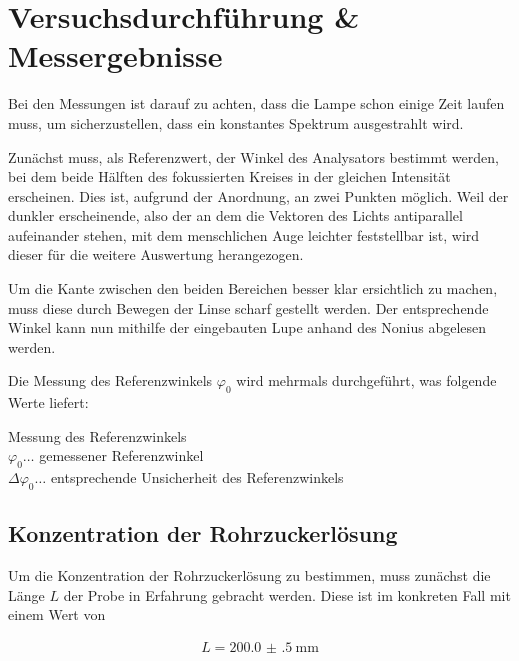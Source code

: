 \documentclass[11pt,ngerman]{scrartcl}
\begin{document}
\section{Versuchsdurchführung \& Messergebnisse}\label{sec:Versuchsdurchführung}

Bei den Messungen ist darauf zu achten, dass die Lampe schon einige Zeit laufen muss, um sicherzustellen, dass ein konstantes Spektrum ausgestrahlt wird.

Zunächst muss, als Referenzwert, der Winkel des Analysators bestimmt werden, bei dem beide Hälften des fokussierten Kreises in der gleichen Intensität erscheinen. Dies ist, aufgrund der Anordnung, an zwei Punkten möglich. Weil der dunkler erscheinende, also der an dem die Vektoren des Lichts antiparallel aufeinander stehen, mit dem menschlichen Auge leichter feststellbar ist, wird dieser für die weitere Auswertung herangezogen.

Um die Kante zwischen den beiden Bereichen besser klar ersichtlich zu machen, muss diese durch Bewegen der Linse scharf gestellt werden. Der entsprechende Winkel kann nun mithilfe der eingebauten Lupe anhand des Nonius abgelesen werden.

\vspace{2mm}

Die Messung des Referenzwinkels $\varphi_0$ wird mehrmals durchgeführt, was folgende Werte liefert:

\begin{table}[H]
	\caption{Messung des Referenzwinkels \\ $\varphi_0 \dots$ gemessener
		Referenzwinkel \\ $\Delta\varphi_0 \dots$ entsprechende Unsicherheit des
		Referenzwinkels}
	\label{tab:refwinkel}
	\centering
	
\end{table}

\subsection{Konzentration der Rohrzuckerlösung}

Um die Konzentration der Rohrzuckerlösung zu bestimmen, muss zunächst die Länge $L$ der Probe in Erfahrung gebracht werden. Diese ist im konkreten Fall mit einem Wert von

\begin{align*}
	L = \SI{200.0(5)}{\mm}
	\label{eq:langewert}
\end{align*}
\end{document}
